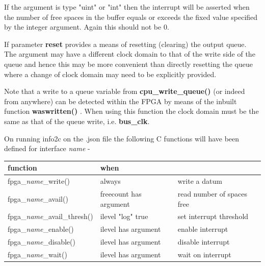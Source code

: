             If the argument is type "uint" or "int" then the interrupt will be
            asserted when the number of free spaces in the buffer equals or exceeds
            the fixed value specified by the integer argument. Again this should not
            be 0.

            If parameter {\bf reset} provides a means of resetting (clearing) the
            output queue. The argument may have a different clock domain to that of
            the write side of the queue and hence this may be more convenient than
            directly resetting the queue where a change of clock domain may need to
            be explicitly provided.

            Note that a write to a queue variable from {\bf cpu\_write\_queue()} (or
            indeed from anywhere) can be detected within the FPGA by means of the
            inbuilt function {\bf waswritten()} . When
            using this function the clock domain must be the same as that of the
            queue write, i.e. {\bf bus\_clk}.
            
            On running info2c on the .json file the following C functions will have
            been defined for interface {\em name} -
            
            \begin{tabular}{| l | l | l |}
            \hline
            function                          & when                   &                            \\ \hline \hline
            fpga\_{\em name}\_write()         & always                 & write a datum              \\ \hline
            fpga\_{\em name}\_avail()         & freecount has argument & read number of spaces free \\ \hline
            fpga\_{\em name}\_avail\_thresh() & ilevel "log" true      & set interrupt threshold    \\ \hline
            fpga\_{\em name}\_enable()        & ilevel has argument    & enable interrupt           \\ \hline
            fpga\_{\em name}\_disable()       & ilevel has argument    & disable interrupt          \\ \hline 
            fpga\_{\em name}\_wait()          & ilevel has argument    & wait on interrupt          \\ \hline  
            \end{tabular}


